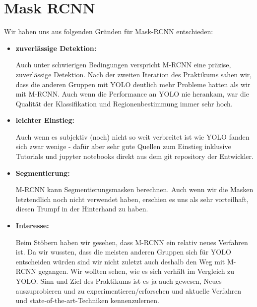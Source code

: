 \section{Mask RCNN}
Wir haben uns aus folgenden Gründen für Mask-RCNN entschieden:
\begin{itemize}
	\item \textbf{zuverlässige Detektion:}

		Auch unter schwierigen Bedingungen verspricht M-RCNN eine präzise, zuverlässige Detektion.
		Nach der zweiten Iteration des Praktikums sahen wir, dass die anderen Gruppen mit YOLO deutlich mehr Probleme hatten als wir mit M-RCNN. Auch wenn die Performance an YOLO nie herankam, war die Qualität der Klassifikation und Regionenbestimmung immer sehr hoch.
	\item \textbf{leichter Einstieg:}

		Auch wenn es subjektiv (noch) nicht so weit verbreitet ist wie YOLO fanden sich zwar wenige - dafür aber sehr gute Quellen zum Einstieg inklusive Tutorials und jupyter notebooks direkt aus dem git repository der Entwickler.
	\item \textbf{Segmentierung:}

		M-RCNN kann Segmentierungsmasken berechnen.
		Auch wenn wir die Masken letztendlich noch nicht verwendet haben, erschien es uns als sehr vorteilhaft, diesen Trumpf in der Hinterhand zu haben.
	\item \textbf{Interesse:}

		Beim Stöbern haben wir gesehen, dass M-RCNN ein relativ neues Verfahren ist.
		Da wir wussten, dass die meisten anderen Gruppen sich für YOLO entscheiden würden sind wir nicht zuletzt auch deshalb den Weg mit M-RCNN gegangen.
		Wir wollten sehen, wie es sich verhält im Vergleich zu YOLO. Sinn und Ziel des Praktikums ist es ja auch gewesen, Neues auszuprobieren und zu experimentieren/erforschen und aktuelle Verfahren und state-of-the-art-Techniken kennenzulernen.

\end{itemize}
